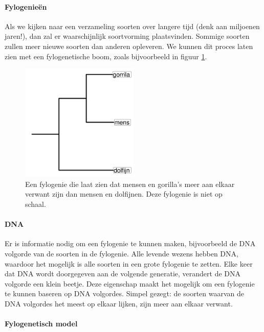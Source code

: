 {\paragraph{Fylogenieën}

Als we kijken naar een verzameling soorten over langere tijd (denk
aan miljoenen jaren!), dan zal er waarschijnlijk 
soortvorming plaatsvinden. Sommige soorten zullen meer nieuwe soorten
dan anderen opleveren. We kunnen dit proces laten zien met een
fylogenetische boom, zoals bijvoorbeeld in figuur \ref{fig:fylogenie}.

\begin{figure}
  \centering
  \includegraphics[width=0.5\textwidth]{fylogenie.png}
  \caption{
    Een fylogenie die laat zien dat mensen en gorilla's 
    meer aan elkaar verwant zijn dan mensen en dolfijnen.
    Deze fylogenie is niet op schaal.
  }
  \label{fig:fylogenie}
\end{figure}

\paragraph{DNA}

Er is informatie nodig om een fylogenie te kunnen maken,
bijvoorbeeld de DNA volgorde van de soorten in de fylogenie.
Alle levende wezens hebben DNA, waardoor het mogelijk is alle
soorten in een grote fylogenie te zetten.
Elke keer dat DNA wordt doorgegeven aan de volgende generatie,
verandert de DNA volgorde een klein beetje. 
Deze eigenschap maakt het mogelijk om een fylogenie te
kunnen baseren op DNA volgordes.
Simpel gezegt: de soorten waarvan de DNA volgordes het meest op elkaar
lijken, zijn meer aan elkaar verwant.

\paragraph{Fylogenetisch model}

}
